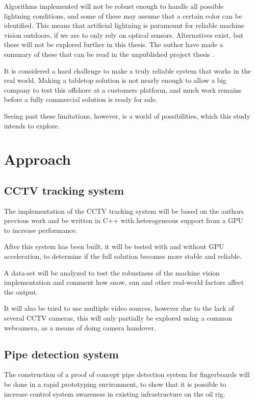 Algorithms implemented will not be robust enough to handle all possible lightning conditions, and some of these may assume that a certain color can be identified. This means that artificial lightning is paramount for reliable machine vision outdoors, if we are to only rely on optical sensors. Alternatives exist, but these will not be explored further in this thesis. The author have made a summary of these that can be read in the unpublished project thesis \citet{joakimsk14}.

It is considered a hard challenge to make a truly reliable system that works in the real world. Making a tabletop solution is not nearly enough to allow a big company to test this offshore at a customers platform, and much work remains before a fully commercial solution is ready for sale.

Seeing past these limitations, however, is a world of possibilities, which this study intends to explore.

\section{Approach}
\subsection{CCTV tracking system}
The implementation of the CCTV tracking system will be based on the authors previous work and be written in C++ with heterogeneous support from a GPU to increase performance.

After this system has been built, it will be tested with and without GPU acceleration, to determine if the full solution becomes more stable and reliable.

A data-set will be analyzed to test the robustness of the machine vision implementation and comment how snow, sun and other real-world factors affect the output.

It will also be tried to use multiple video sources, however due to the lack of several CCTV cameras, this will only partially be explored using a common webcamera, as a means of doing camera handover.

\subsection{Pipe detection system}
The construction of a proof of concept pipe detection system for fingerboards will be done in a rapid prototyping environment, to show that it is possible to increase control system awareness in existing infrastructure on the oil rig.

